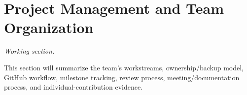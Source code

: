 \section{Project Management and Team Organization}
\label{sec:management}

\textit{Working section.}

This section will summarize the team's workstreams, ownership/backup model,
GitHub workflow, milestone tracking, review process, meeting/documentation process,
and individual-contribution evidence.
